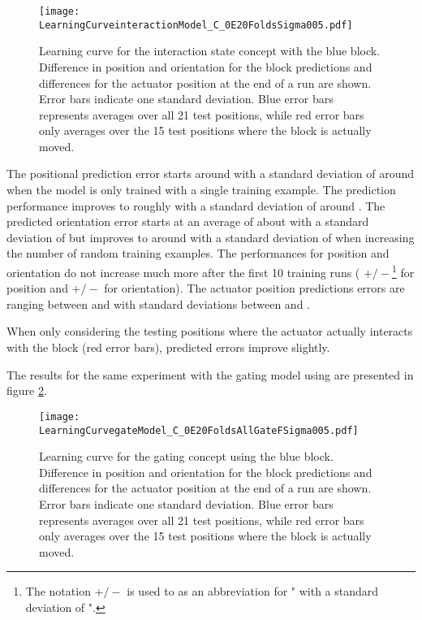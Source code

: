 \begin{figure}[h]
\centering
\texttt{[image: LearningCurveinteractionModel\_C\_0E20FoldsSigma005.pdf]}
\caption{Learning curve for the interaction state concept with the blue block. Difference in position and orientation for the block predictions and differences for the actuator position at the end of a run are shown. Error bars indicate one standard deviation. Blue error bars represents averages over all 21 test positions, while red error bars only averages over the 15 test positions where the block is actually moved.}
\label{fig:learnCurveInteraction1}
\end{figure}

The positional prediction error starts around  with a standard deviation of around  when the model is only trained with a single training example. The prediction performance improves to roughly  with a standard deviation of around .
The predicted orientation error starts at an average of about  with a standard deviation of  but improves to around  with a standard deviation of  when increasing the number of random training examples.
The performances for position and orientation do not increase much more after the first 10 training runs ( $+/-$\footnote{The notation $+/-$ is used to as an abbreviation for " with a standard deviation of ".}  for position and  $+/-$  for orientation).
The actuator position predictions errors are ranging between  and  with standard deviations between  and .

When only considering the testing positions where the actuator actually interacts with the block (red error bars), predicted errors improve slightly.

The results for the same experiment with the gating model using are presented in figure \ref{fig:learnCurveGate1}.

\begin{figure}[h]
\centering
\texttt{[image: LearningCurvegateModel\_C\_0E20FoldsAllGateFSigma005.pdf]}
\caption{Learning curve for the gating concept using the blue block. Difference in position and orientation for the block predictions and differences for the actuator position at the end of a run are shown. Error bars indicate one standard deviation. Blue error bars represents averages over all 21 test positions, while red error bars only averages over the 15 test positions where the block is actually moved.}
\label{fig:learnCurveGate1}
\end{figure}

